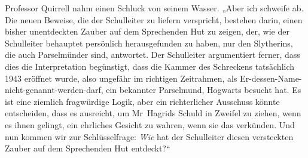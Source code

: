 Professor Quirrell nahm einen Schluck von seinem Wasser.
„Aber ich schweife ab. Die neuen Beweise, die der Schulleiter zu liefern verspricht, bestehen darin, einen bisher unentdeckten Zauber auf dem Sprechenden Hut zu zeigen, der, wie der Schulleiter behauptet persönlich herausgefunden zu haben, nur den Slytherins, die auch Parselmünder sind, antwortet. Der Schulleiter argumentiert ferner, dass dies die Interpretation begünstigt, dass die Kammer des Schreckens tatsächlich 1943 eröffnet wurde, also ungefähr im richtigen Zeitrahmen, als Er-dessen-Name-nicht-genannt-werden-darf, ein bekannter Parselmund, Hogwarts besucht hat. Es ist eine ziemlich fragwürdige Logik, aber ein richterlicher Ausschuss könnte entscheiden, dass es ausreicht, um Mr~Hagrids Schuld in Zweifel zu ziehen, wenn es ihnen gelingt, ein ehrliches Gesicht zu wahren, wenn sie das verkünden. Und nun kommen wir zur Schlüsselfrage: \emph{Wie} hat der Schulleiter diesen versteckten Zauber auf dem Sprechenden Hut entdeckt?“

